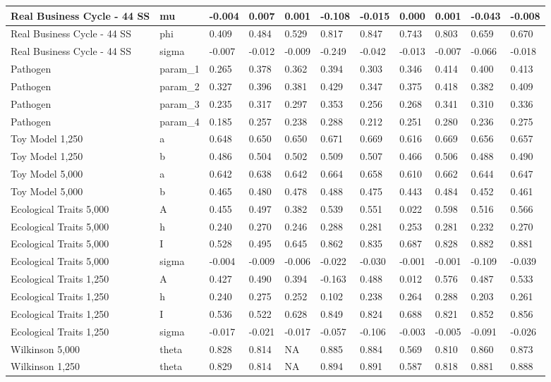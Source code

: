 \documentclass[]{article}
\begin{document}
\begin{tabular}{l|l|l|l|l|l|l|l|l|l|l}
\hline
Real Business Cycle - 44 SS & mu & -0.004 & 0.007 & 0.001 & -0.108 & -0.015 & 0.000 & 0.001 & -0.043 & -0.008\\
\hline
Real Business Cycle - 44 SS & phi & 0.409 & 0.484 & 0.529 & 0.817 & 0.847 & 0.743 & 0.803 & 0.659 & 0.670\\
\hline
Real Business Cycle - 44 SS & sigma & -0.007 & -0.012 & -0.009 & -0.249 & -0.042 & -0.013 & -0.007 & -0.066 & -0.018\\
\hline
Pathogen & param\_1 & 0.265 & 0.378 & 0.362 & 0.394 & 0.303 & 0.346 & 0.414 & 0.400 & 0.413\\
\hline
Pathogen & param\_2 & 0.327 & 0.396 & 0.381 & 0.429 & 0.347 & 0.375 & 0.418 & 0.382 & 0.409\\
\hline
Pathogen & param\_3 & 0.235 & 0.317 & 0.297 & 0.353 & 0.256 & 0.268 & 0.341 & 0.310 & 0.336\\
\hline
Pathogen & param\_4 & 0.185 & 0.257 & 0.238 & 0.288 & 0.212 & 0.251 & 0.280 & 0.236 & 0.275\\
\hline
Toy Model 1,250 & a & 0.648 & 0.650 & 0.650 & 0.671 & 0.669 & 0.616 & 0.669 & 0.656 & 0.657\\
\hline
Toy Model 1,250 & b & 0.486 & 0.504 & 0.502 & 0.509 & 0.507 & 0.466 & 0.506 & 0.488 & 0.490\\
\hline
Toy Model 5,000 & a & 0.642 & 0.638 & 0.642 & 0.664 & 0.658 & 0.610 & 0.662 & 0.644 & 0.647\\
\hline
Toy Model 5,000 & b & 0.465 & 0.480 & 0.478 & 0.488 & 0.475 & 0.443 & 0.484 & 0.452 & 0.461\\
\hline
Ecological Traits 5,000 & A & 0.455 & 0.497 & 0.382 & 0.539 & 0.551 & 0.022 & 0.598 & 0.516 & 0.566\\
\hline
Ecological Traits 5,000 & h & 0.240 & 0.270 & 0.246 & 0.288 & 0.281 & 0.253 & 0.281 & 0.232 & 0.270\\
\hline
Ecological Traits 5,000 & I & 0.528 & 0.495 & 0.645 & 0.862 & 0.835 & 0.687 & 0.828 & 0.882 & 0.881\\
\hline
Ecological Traits 5,000 & sigma & -0.004 & -0.009 & -0.006 & -0.022 & -0.030 & -0.001 & -0.001 & -0.109 & -0.039\\
\hline
Ecological Traits 1,250 & A & 0.427 & 0.490 & 0.394 & -0.163 & 0.488 & 0.012 & 0.576 & 0.487 & 0.533\\
\hline
Ecological Traits 1,250 & h & 0.240 & 0.275 & 0.252 & 0.102 & 0.238 & 0.264 & 0.288 & 0.203 & 0.261\\
\hline
Ecological Traits 1,250 & I & 0.536 & 0.522 & 0.628 & 0.849 & 0.824 & 0.688 & 0.821 & 0.852 & 0.856\\
\hline
Ecological Traits 1,250 & sigma & -0.017 & -0.021 & -0.017 & -0.057 & -0.106 & -0.003 & -0.005 & -0.091 & -0.026\\
\hline
Wilkinson 5,000 & theta & 0.828 & 0.814 & NA & 0.885 & 0.884 & 0.569 & 0.810 & 0.860 & 0.873\\
\hline
Wilkinson 1,250 & theta & 0.829 & 0.814 & NA & 0.894 & 0.891 & 0.587 & 0.818 & 0.881 & 0.888\\
\hline
\end{tabular}
\end{document}
